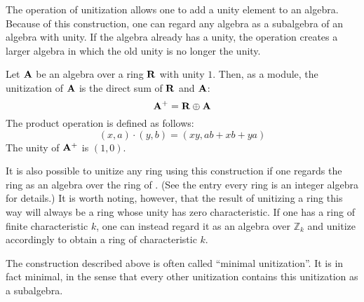 \documentclass[12pt]{article}
\def\A{\bf A}
\def\R{\bf R}
\begin{document}
The operation of unitization allows one to add a unity element to an algebra.  Because of this construction, one can regard any algebra as a subalgebra of an algebra with unity.  If the algebra already has a unity, the operation creates a larger algebra in which the old unity is no longer the unity.

Let $\A$ be an algebra over a ring $\R$ with unity $1$.  Then, as a module, the unitization of $\A$ is the direct sum of $\R$ and $\A$:
\[
\A^+ = \R \oplus \A
\]
The product operation is defined as follows:
\[
(x, a) \cdot (y, b) = (xy, ab + xb + ya)
\]
The unity of $\A^+$ is $(1,0)$.

It is also possible to unitize any ring using this construction if one regards the ring as an algebra over the ring of .  (See the entry every ring is an integer algebra for details.)  It is worth noting, 
however, that the result of unitizing a ring this way will always be a ring whose unity has zero characteristic.  If one
has a ring of finite characteristic $k$, one can instead regard it as an algebra over $\mathbb{Z}_k$ and unitize
accordingly to obtain a ring of characteristic $k$.

The construction described above is often  called ``minimal unitization''. It is in fact minimal, in the sense that 
every other unitization contains this unitization as a subalgebra.
\end{document}
